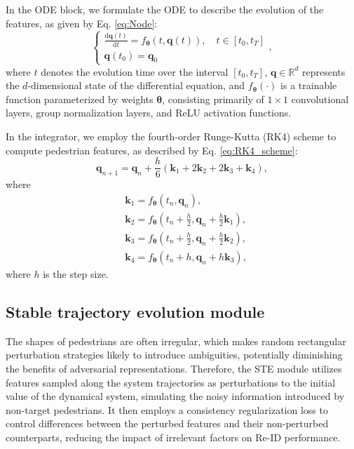 \documentclass[12pt]{spieman}  %
\begin{document}
\begin{spacing}{2}
In the ODE block, we formulate the ODE to describe the evolution of the features, as given by Eq. \eqref{eq:Node}:
\begin{equation}
	\label{eq:Node}
	\left.\left\{\begin{array}{l}\frac{\mathrm{d}\boldsymbol{q}(t)}{\mathrm{d}t}=f_{\boldsymbol{\theta}}(t,\boldsymbol{q}(t)),\quad t\in[t_{0},t_{T}]\\\boldsymbol{q}(t_0)=\boldsymbol{q}_{0}\end{array}\right.\right.,
\end{equation}
where $t$ denotes the evolution time over the interval $[t_0, t_T]$, $\boldsymbol{q} \in \mathbb{R}^{d}$ represents the $d$-dimensional state of the differential equation, and $f_{\boldsymbol{\theta}}(\cdot)$ is a trainable function parameterized by weights $\boldsymbol{\theta}$, consisting primarily of $1\times1$ convolutional layers, group normalization layers, and ReLU activation functions.

In the integrator, we employ the fourth-order Runge-Kutta (RK4) scheme to compute pedestrian features, as described by Eq. \eqref{eq:RK4_scheme}:
\begin{equation}
	\label{eq:RK4_scheme}
	\boldsymbol q_{n+1}=\boldsymbol q_n+\frac{h}{6}\left(\boldsymbol k_1+2\boldsymbol k_2+2\boldsymbol k_3+\boldsymbol k_4\right),
\end{equation}
where
\begin{equation}
	\begin{aligned}
		&\boldsymbol k_{1} =f_{\boldsymbol{\theta}} \left(t_n, \boldsymbol q_{n}\right), \\
		&\boldsymbol k_{2} =f_{\boldsymbol{\theta}} \left(t_n+\frac{h}{2}, \boldsymbol q_{n}+\frac{h}{2}\boldsymbol{k}_{1}\right), \\
		&\boldsymbol k_{3} =f_{\boldsymbol{\theta}} \left(t_n+\frac{h}{2}, \boldsymbol q_{n}+\frac{h}{2}\boldsymbol{k}_{2}\right), \\
		&\boldsymbol k_{4} =f_{\boldsymbol{\theta}} \left(t_n+h, \boldsymbol q_{n}+h\boldsymbol{k}_{3}\right),
	\end{aligned}
\end{equation}
where $h$ is the step size.

\subsection{Stable trajectory evolution module}
The shapes of pedestrians are often irregular, which makes random rectangular perturbation strategies likely to introduce ambiguities, potentially diminishing the benefits of adversarial representations. Therefore, the STE module utilizes features sampled along the system trajectories as perturbations to the initial value of the dynamical system, simulating the noisy information introduced by non-target pedestrians. It then employs a consistency regularization loss to control differences between the perturbed features and their non-perturbed counterparts, reducing the impact of irrelevant factors on Re-ID performance.


\end{spacing}
\end{document}
